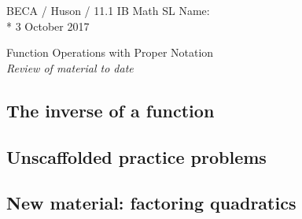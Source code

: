 \documentclass[]{book}
\begin{document}
\noindent BECA / Huson / 11.1 IB Math SL \hspace{2in} Name:\\*
3 October 2017
\begin{center}
{\Large Function Operations with Proper Notation}\\
\textit{Review of material to date}
\end{center}



\begin{enumerate}
\subsection*{The inverse of a function}


\subsection*{Unscaffolded practice problems}


\subsection*{New material: factoring quadratics}


%

%

%

%
	

\end{enumerate}
\end{document}

